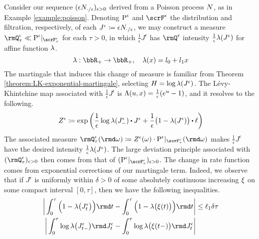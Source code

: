 \begin{example}
  \label{example:hawkes}
  Consider our sequence $(\epsilon N_{\cdot/\epsilon})_{\epsilon>0}$ derived from a Poisson process $N$, as in Example \ref{example:poisson}.
  Denoting ${\operatorname{P}}^\epsilon$ and $\scrF^\epsilon$ the distribution and filtration, respectively, of each $J^\epsilon \coloneqq \epsilon N_{\cdot/\epsilon}$, we may construct a measure $\mgPrb^\epsilon_\tau \ll \Prb^\epsilon|_{\scrF^\epsilon_\tau}$ for each $\tau > 0$, in which $\frac1\epsilon J^\epsilon$ has $\mgPrb^\epsilon$ intensity $\frac1\epsilon\lambda(J^\epsilon)$ for affine function $\lambda$.
  \begin{equation*}
    \affInt: \bbR_+ \rightarrow \bbR_+, \quad \affInt(\stateVar) = \affIntPart_0 + \affIntPart_1 \stateVar
  \end{equation*}
  The martingale that induces this change of measure is familiar from Theorem \ref{theorem:LK-exponential-martingale}, selecting $H = \log\lambda(J^\epsilon)$.
  The L\'evy-Khintchine map associated with $\frac1\epsilon J^\epsilon$ is $\Lambda(u, x) = \frac1\epsilon (e^u - 1)$, and it resolves to the following.
  \begin{equation*}
    \mgDensity^\epsilon \defeq \exp\bigg( \frac1\epsilon \log\affInt(J^\epsilon_-) \shortInt J^\epsilon + \frac1\epsilon\big( 1 - \affInt(J^\epsilon) \big) \shortInt \leb \bigg)
  \end{equation*}
  The associated measure $\mgPrb^\epsilon_\tau(\rmd\omega) \defeq \mgDensity^\epsilon(\omega) \cdot \Prb^\epsilon|_{\scrF^\epsilon_\tau}(\rmd\omega)$ makes $\frac1\epsilon J^\epsilon$ have the desired intensity $\frac1\epsilon\lambda(J^\epsilon)$.
  The large deviation principle associated with $(\mgPrb^\epsilon_\tau)_{\epsilon>0}$ then comes from that of $(\Prb^\epsilon|_{\scrF^\epsilon_\tau})_{\epsilon>0}$.
  The change in rate function comes from exponential corrections of our martingale term.
  Indeed, we observe that if $J^\epsilon$ is uniformly within $\delta > 0$ of some absolutely continuous increasing $\xi$ on some compact interval $[0,\tau]$, then we have the following inequalities.
  \begin{align*}
    \bigg| \int_0^\tau \Big( 1 - \affInt\big(J^\epsilon_t\big) \Big) \rmd t - \int_0^\tau \Big( 1 - \affInt\big( \pathVar(t) \big) \Big) \rmd t \bigg|
    &\leq \ell_1 \delta \tau \\
    \bigg| \int_0^\tau \log\affInt\big(J^\epsilon_{t-}\big) \rmd J^\epsilon_t - \int_0^\tau \log\affInt\big(\pathVar(t-)\big) \rmd J^\epsilon_t \bigg| 

\end{align*}
\end{example}

